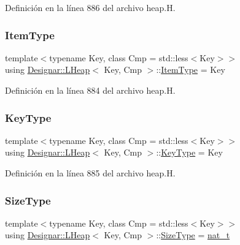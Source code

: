 Definición en la línea 886 del archivo heap.\+H.

\mbox{\label{class_designar_1_1_l_heap_abb88755259887662cd93045937b6a045}} 
\subsubsection{\texorpdfstring{Item\+Type}{ItemType}}
{\footnotesize\ttfamily template$<$typename Key, class Cmp = std\+::less$<$\+Key$>$$>$ \\
using \hyperlink{class_designar_1_1_l_heap}{Designar\+::\+L\+Heap}$<$ Key, Cmp $>$\+::\hyperlink{class_designar_1_1_l_heap_abb88755259887662cd93045937b6a045}{Item\+Type} =  Key}



Definición en la línea 884 del archivo heap.\+H.

\mbox{\label{class_designar_1_1_l_heap_a8d4160e7d11e74de54685fe905e30aa4}} 
\subsubsection{\texorpdfstring{Key\+Type}{KeyType}}
{\footnotesize\ttfamily template$<$typename Key, class Cmp = std\+::less$<$\+Key$>$$>$ \\
using \hyperlink{class_designar_1_1_l_heap}{Designar\+::\+L\+Heap}$<$ Key, Cmp $>$\+::\hyperlink{class_designar_1_1_l_heap_a8d4160e7d11e74de54685fe905e30aa4}{Key\+Type} =  Key}



Definición en la línea 885 del archivo heap.\+H.

\mbox{\label{class_designar_1_1_l_heap_a2220ce9a3ac8209fda43d10778943e91}} 
\subsubsection{\texorpdfstring{Size\+Type}{SizeType}}
{\footnotesize\ttfamily template$<$typename Key, class Cmp = std\+::less$<$\+Key$>$$>$ \\
using \hyperlink{class_designar_1_1_l_heap}{Designar\+::\+L\+Heap}$<$ Key, Cmp $>$\+::\hyperlink{class_designar_1_1_l_heap_a2220ce9a3ac8209fda43d10778943e91}{Size\+Type} =  \hyperlink{namespace_designar_aa72662848b9f4815e7bf31a7cf3e33d1}{nat\+\_\+t}}



